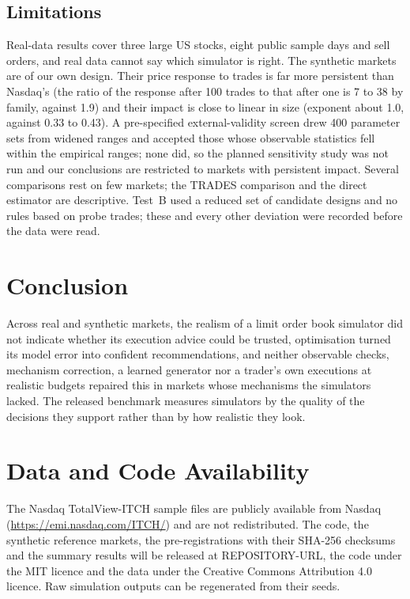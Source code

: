\documentclass{ieeeaccess}
\begin{document}
\subsection{Limitations}
Real-data results cover three large US stocks, eight public sample days and sell orders, and real data cannot say which
simulator is right. The synthetic markets are of our own design. Their price response to trades is far more persistent
than Nasdaq's (the ratio of the response after 100 trades to that after one is 7 to 38 by family, against 1.9) and their
impact is close to linear in size (exponent about 1.0, against 0.33 to 0.43). A pre-specified external-validity screen
drew 400 parameter sets from widened ranges and accepted those whose observable statistics fell within the empirical
ranges; none did, so the planned sensitivity study was not run and our conclusions are restricted to markets with
persistent impact. Several comparisons rest on few markets; the TRADES comparison and the direct estimator are
descriptive. Test~B used a reduced set of candidate designs and no rules based on probe trades; these and every other
deviation were recorded before the data were read.

\section{Conclusion}
\label{sec:conclusion}
Across real and synthetic markets, the realism of a limit order book simulator did not indicate whether its execution
advice could be trusted, optimisation turned its model error into confident recommendations, and neither observable
checks, mechanism correction, a learned generator nor a trader's own executions at realistic budgets repaired this in
markets whose mechanisms the simulators lacked. The released benchmark measures simulators by the quality of the
decisions they support rather than by how realistic they look.

\section*{Data and Code Availability}
The Nasdaq TotalView-ITCH sample files are publicly available from Nasdaq (\url{https://emi.nasdaq.com/ITCH/}) and are
not redistributed. The code, the synthetic reference markets, the pre-registrations with their SHA-256 checksums and the
summary results will be released at REPOSITORY-URL, the code under the MIT licence and the data under the Creative
Commons Attribution 4.0 licence. Raw simulation outputs can be regenerated from their seeds.
\end{document}

